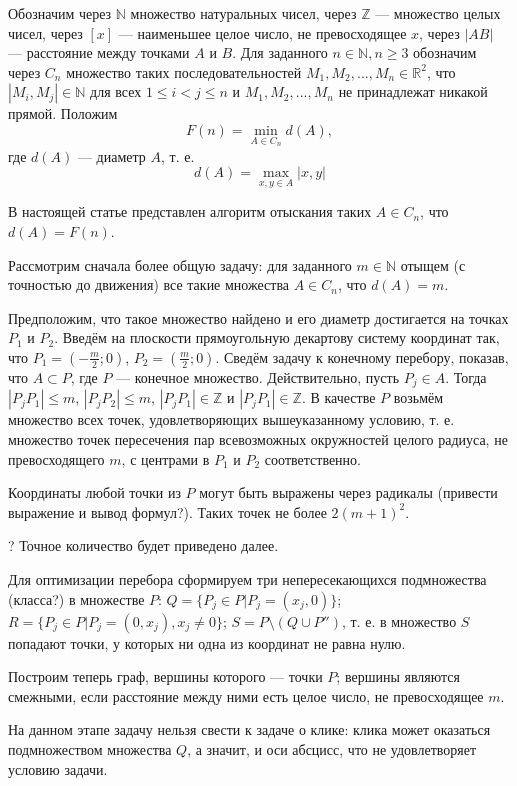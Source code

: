 \documentclass{article}
\begin{document}
Обозначим через $\mathbb{N}$ множество натуральных чисел, через $\mathbb{Z}$ --- множество целых чисел, через $[x]$ --- наименьшее целое число, не превосходящее $x$, через $|AB|$ --- расстояние между точками $A$ и $B$.
Для заданного $n\in \mathbb{N}, n\geq 3$ обозначим через $C_n$ множество таких последовательностей $M_1,M_2,...,M_n \in \mathbb{R}^2$, что $|M_i,M_j|\in\mathbb{N}$ для всех $1\leq i < j  \leq n$ и  $M_1,M_2,...,M_n$ не принадлежат никакой прямой.
Положим
$$
F(n)=\min\limits_{A\in C_n} d(A),
$$
где $d(A)$ --- диаметр $A$, т. е.
$$
d(A)=\max\limits_{x,y\in A}|x,y|
$$

В настоящей статье представлен алгоритм отыскания таких $A \in C_n$, что $d(A) = F(n)$.






Рассмотрим сначала более общую задачу: для заданного $m \in \mathbb{N}$ отыщем (с точностью до движения) все такие множества $A \in C_n$, что $d(A) = m$.

Предположим, что такое множество найдено и его диаметр достигается на точках $P_1$ и $P_2$.
Введём на плоскости прямоугольную декартову систему координат так, что $P_1 = \left(-\frac{m}{2}; 0 \right)$, $P_2 = \left(\frac{m}{2}; 0\right)$.
Сведём задачу к конечному перебору, показав, что $A \subset P$, где $P$ --- конечное множество.
Действительно, пусть $P_{j} \in A$.
Тогда $|P_{j} P_1| \leq m$, $|P_{j} P_2| \leq m$, $|P_{j} P_1| \in \mathbb{Z}$ и $|P_{j} P_1| \in \mathbb{Z}$.
В качестве $P$ возьмём множество всех точек, удовлетворяющих вышеуказанному условию, т. е. множество точек пересечения пар всевозможных окружностей целого радиуса, не превосходящего $m$, с центрами в $P_1$ и $P_2$ соответственно.

Координаты любой точки из $P$ могут быть выражены через радикалы (привести выражение и вывод формул?).
Таких точек не более $2(m+1)^2$.

? Точное количество будет приведено далее.

Для оптимизации перебора сформируем три непересекающихся подмножества (класса?) в множестве $P$:
$Q = \{P_j \in P | P_j = (x_j, 0)\}$;
$R = \{P_j \in P | P_j = (0, x_j), x_j \neq 0\}$;
$S = P \setminus \left( Q \cup P ''\right)$,
т. е. в множество $S$ попадают точки, у которых ни одна из координат не равна нулю.

Построим теперь граф, вершины которого --- точки $P$;
вершины являются смежными, если расстояние между ними есть целое число, не превосходящее $m$.

На данном этапе задачу нельзя свести к задаче о клике:
клика может оказаться подмножеством множества $Q$, а значит, и оси абсцисс, что не удовлетворяет условию задачи.
\end{document}

